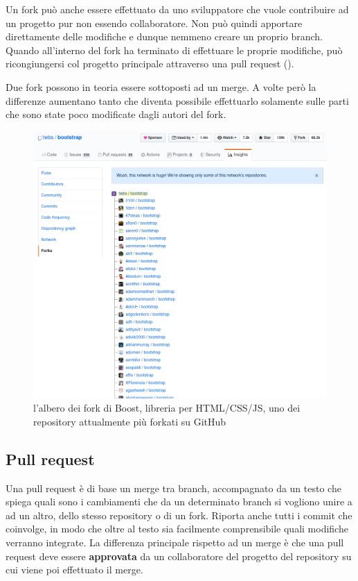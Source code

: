 \documentclass{article}
\begin{document}
Un fork può anche essere effettuato da uno sviluppatore che vuole contribuire ad
un progetto pur non essendo collaboratore. Non può quindi apportare direttamente
delle modifiche e dunque nemmeno creare un proprio branch.
Quando all'interno del fork ha terminato di effettuare le proprie modifiche, può
ricongiungersi col progetto principale attraverso una pull request
({}).

Due fork possono in teoria essere sottoposti ad un merge. A volte però la
differenze aumentano tanto che diventa possibile effettuarlo
solamente sulle parti che sono state poco modificate dagli autori del fork.

\begin{figure}
\includegraphics[width=6in]{img/fork.png}
\centering
\caption{l'albero dei fork di Boost, libreria per HTML/CSS/JS, uno dei
repository attualmente più forkati su GitHub }
\end{figure}

\subsection{Pull request\label{pullrequest}}
Una pull request è di base un merge tra branch, accompagnato da un testo che
spiega quali sono i cambiamenti che da un determinato branch si vogliono unire a
ad un altro, dello stesso repository o di un fork.
Riporta anche tutti i commit che coinvolge, in modo che oltre al testo sia
facilmente comprensibile quali modifiche verranno integrate.
La differenza principale rispetto ad un merge è che una pull request deve essere
\textbf{approvata} da un collaboratore del progetto del repository su cui viene
poi effettuato il merge.
\end{document}
